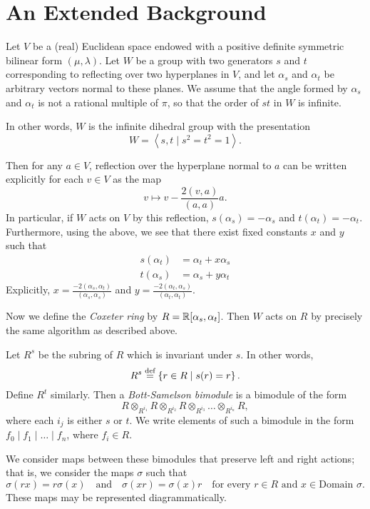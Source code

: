 \appendix

\section{An Extended Background}
\label{sec:prelim_background}
Let $V$ be a (real) Euclidean space endowed with a positive definite symmetric bilinear form $(\mu, \lambda)$.
Let $W$ be a group with two generators $s$ and $t$ corresponding to reflecting over two hyperplanes in $V$, and let $\alpha_s$ and $\alpha_t$ be arbitrary vectors normal to these planes.  We assume that the angle formed by $\alpha_s$ and $\alpha_t$ is not a rational multiple of $\pi$, so that the order of $st$ in $W$ is infinite.  

In other words, $W$ is the infinite dihedral group with the presentation \[ W = \left<s,t \mid s^2=t^2=1\right>. \] 

Then for any $a \in V$, reflection over the hyperplane normal to $a$ can be written explicitly for each $v \in V$ as the map \[ v \mapsto v - \frac{2(v,a)}{(a,a)} a. \]  
In particular, if $W$ acts on $V$ by this reflection, $s(\alpha_s) = -\alpha_s$ and $t(\alpha_t) = -\alpha_t$.  Furthermore, using the above, we see that there exist fixed constants $x$ and $y$ such that
\begin{align*}
	s(\alpha_t) &= \alpha_t + x \alpha_s \\
	t(\alpha_s) &= \alpha_s + y \alpha_t
\end{align*}
Explicitly, $x = \frac{-2(\alpha_s,\alpha_t)}{(\alpha_s, \alpha_s)}$ and $y = \frac{-2(\alpha_t,\alpha_s)}{(\alpha_t,\alpha_t)}$.  

Now we define the \emph{Coxeter ring} by $R = \mathbb R[\alpha_s, \alpha_t]$.  Then $W$ acts on $R$ by precisely the same algorithm as described above.

Let $R^s$ be the subring of $R$ which is invariant under $s$.  In other words,
\[ R^s \stackrel{\text{def}}{=} \left\{ r \in R \mid s(r) = r \right\}. \]
Define $R^t$ similarly.  Then a \emph{Bott-Samelson bimodule} is a bimodule of the form
\[ R \otimes_{R^{i_1}} R \otimes_{R^{i_2}} R \otimes_{R^{i_3}} \dots \otimes_{R^{i_n}} R, \]
where each $i_j$ is either $s$ or $t$.   We write elements of such a bimodule in the form $f_0 \mid f_1 \mid \dots \mid f_n$, where $f_i \in R$.

We consider maps between these bimodules that preserve left and right actions; that is, we consider the maps $\sigma$ such that
\begin{equation}
	\sigma(rx) = r\sigma(x) \quad\text{and}\quad \sigma(xr) = \sigma(x)r \quad\text{for every $r \in R$ and $x \in \text{Domain } \sigma$}.
	\label{eq:respect}
\end{equation}
These maps may be represented diagrammatically.

